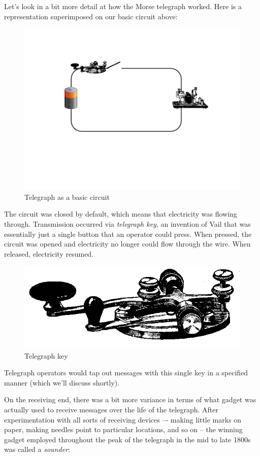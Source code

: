 \documentclass[UTF8]{book}
\begin{document}
\begin{CJK}{UTF8}{gbsn}
Let's look in a bit more detail at how the Morse telegraph worked. Here is a representation superimposed on our basic circuit above:

\begin{figure}[H]
\centering
\includegraphics[width=0.8\linewidth]{telegraph_as_circuit}
\caption{Telegraph as a basic circuit}
\end{figure}

The circuit was closed by default, which means that electricity was flowing through. Transmission occurred via \emph{telegraph key}, an invention of Vail that was essentially just a single button that an operator could press. When pressed, the circuit was opened and electricity no longer could flow through the wire. When released, electricity resumed.

\begin{figure}[H]
\centering
\includegraphics[width=1.0\linewidth]{telegraphkey}
\caption{Telegraph key}
\end{figure}

Telegraph operators would tap out messages with this single key in a specified manner (which we'll discuss shortly).

On the receiving end, there was a bit more variance in terms of what gadget was actually used to receive messages over the life of the telegraph. After experimentation with all sorts of receiving devices –- making little marks on paper, making needles point to particular locations, and so on -- the winning gadget employed throughout the peak of the telegraph in the mid to late 1800s was called a \emph{sounder}:


\end{CJK}
\end{document}

